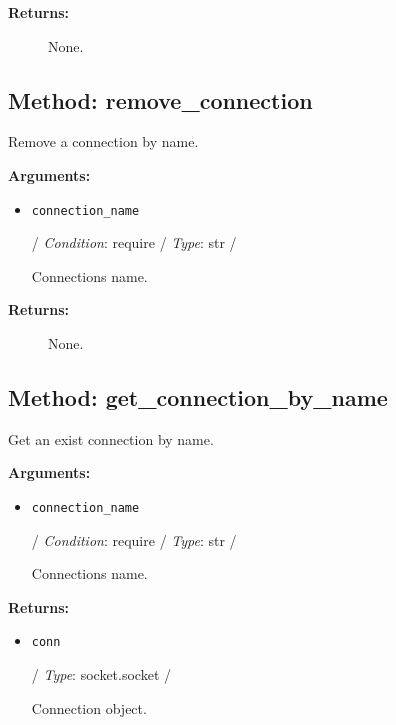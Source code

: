 \begin{description}
\item[\textbf{Returns:}]
None.
\end{description}

\hypertarget{qconnectbase-connection-manager-method-remove_connection-28}{%
\subsection{Method: remove\_connection}\label{qconnectbase-connection-manager-method-remove_connection-28}}

Remove a connection by name.

\textbf{Arguments:}

\begin{itemize}
\item
  \texttt{connection\_name}

  / \emph{Condition}: require / \emph{Type}: str /

  Connection\textquotesingle s name.
\end{itemize}

\begin{description}
\item[\textbf{Returns:}]
None.
\end{description}

\hypertarget{qconnectbase-connection-manager-method-get_connection_by_name-29}{%
\subsection{Method:
get\_connection\_by\_name}\label{qconnectbase-connection-manager-method-get_connection_by_name-29}}

Get an exist connection by name.

\textbf{Arguments:}

\begin{itemize}
\item
  \texttt{connection\_name}

  / \emph{Condition}: require / \emph{Type}: str /

  Connection\textquotesingle s name.
\end{itemize}

\textbf{Returns:}

\begin{itemize}
\item
  \texttt{conn}

  / \emph{Type}: socket.socket /

  Connection object.
\end{itemize}

